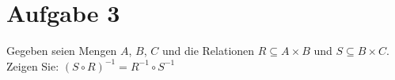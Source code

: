 \section*{Aufgabe 3}

Gegeben seien Mengen $A$, $B$, $C$ und die Relationen $R \subseteq A \times B$ und $S \subseteq B \times C$.\\
Zeigen Sie: $(S \circ R)^{-1} = R^{-1} \circ S^{-1}$

\newpage
